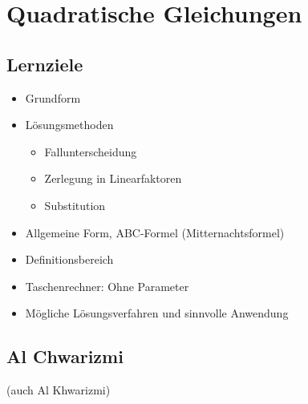 \section{Quadratische Gleichungen}


\newpage

\subsection*{Lernziele}

\begin{itemize}
\item Grundform
\item Lösungsmethoden
  \begin{itemize}
    \item{Fallunterscheidung}
    \item{Zerlegung in Linearfaktoren}
    \item{Substitution}
  \end{itemize}
\item Allgemeine Form, ABC-Formel (Mitternachtsformel)
\item Definitionsbereich
\item Taschenrechner: Ohne Parameter
\item Mögliche Lösungsverfahren und sinnvolle Anwendung
\end{itemize}
\newpage

\TALS{}

\subsection{Al Chwarizmi}

(auch Al Khwarizmi)

